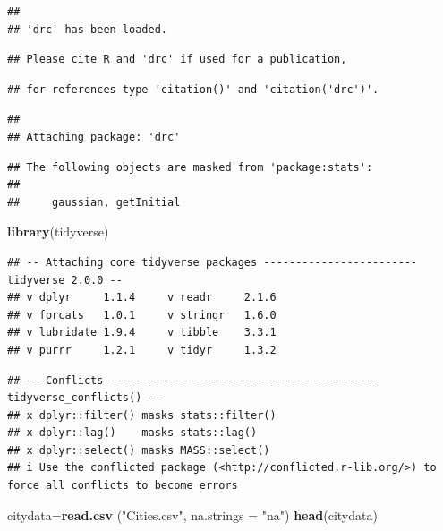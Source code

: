 \documentclass[
]{article}
\newenvironment{Shaded}{\begin{snugshade}}{\end{snugshade}}
\newcommand{\AttributeTok}[1]{\textcolor[rgb]{0.13,0.29,0.53}{#1}}
\newcommand{\FunctionTok}[1]{\textcolor[rgb]{0.13,0.29,0.53}{\textbf{#1}}}
\newcommand{\NormalTok}[1]{#1}
\newcommand{\OtherTok}[1]{\textcolor[rgb]{0.56,0.35,0.01}{#1}}
\newcommand{\StringTok}[1]{\textcolor[rgb]{0.31,0.60,0.02}{#1}}
\begin{document}
\begin{verbatim}
## 
## 'drc' has been loaded.
\end{verbatim}

\begin{verbatim}
## Please cite R and 'drc' if used for a publication,
\end{verbatim}

\begin{verbatim}
## for references type 'citation()' and 'citation('drc')'.
\end{verbatim}

\begin{verbatim}
## 
## Attaching package: 'drc'
\end{verbatim}

\begin{verbatim}
## The following objects are masked from 'package:stats':
## 
##     gaussian, getInitial
\end{verbatim}

\begin{Shaded}
\begin{Highlighting}[]
\FunctionTok{library}\NormalTok{(tidyverse)}
\end{Highlighting}
\end{Shaded}

\begin{verbatim}
## -- Attaching core tidyverse packages ------------------------ tidyverse 2.0.0 --
## v dplyr     1.1.4     v readr     2.1.6
## v forcats   1.0.1     v stringr   1.6.0
## v lubridate 1.9.4     v tibble    3.3.1
## v purrr     1.2.1     v tidyr     1.3.2
\end{verbatim}

\begin{verbatim}
## -- Conflicts ------------------------------------------ tidyverse_conflicts() --
## x dplyr::filter() masks stats::filter()
## x dplyr::lag()    masks stats::lag()
## x dplyr::select() masks MASS::select()
## i Use the conflicted package (<http://conflicted.r-lib.org/>) to force all conflicts to become errors
\end{verbatim}

\begin{Shaded}
\begin{Highlighting}[]
\NormalTok{citydata}\OtherTok{=}\FunctionTok{read.csv}\NormalTok{ (}\StringTok{"Cities.csv"}\NormalTok{, }\AttributeTok{na.strings =} \StringTok{"na"}\NormalTok{)}
\FunctionTok{head}\NormalTok{(citydata)}
\end{Highlighting}
\end{Shaded}
\end{document}
